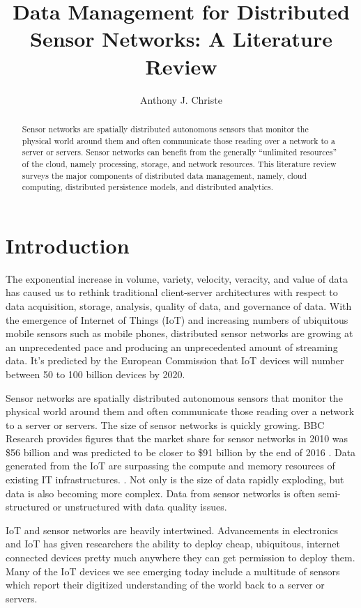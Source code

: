 \documentclass[]{article}
\title{Data Management for Distributed Sensor Networks: A Literature Review}
\author{Anthony J. Christe}
\begin{document}
\maketitle


\begin{abstract}
    Sensor networks are spatially distributed autonomous sensors that monitor the physical world around them and often communicate those reading over a network to a server or servers. Sensor networks can benefit from the generally ``unlimited resources'' of the cloud, namely processing, storage, and network resources. This literature review surveys the major components of distributed data management, namely, cloud computing, distributed persistence models, and distributed analytics.
\end{abstract}

\tableofcontents
\listoffigures
\listoftables
\pagebreak

\section{Introduction} \label{sec:introduction}
The exponential increase in volume, variety, velocity, veracity, and value of data has caused us to rethink traditional client-server architectures with respect to data acquisition, storage, analysis, quality of data, and governance of data. With the emergence of Internet of Things (IoT) and increasing numbers of ubiquitous mobile sensors such as mobile phones, distributed sensor networks are growing at an unprecedented pace and producing an unprecedented amount of streaming data. It's predicted by the European Commission that IoT devices will number between 50 to 100 billion devices by 2020\cite{6072197}.

Sensor networks are spatially distributed autonomous sensors that monitor the physical world around them and often communicate those reading over a network to a server or servers. The size of sensor networks is quickly growing. BBC Research provides figures that the market share for sensor networks in 2010 was \$56 billion and was predicted to be closer to \$91 billion by the end of 2016 \cite{zaslavsky_sensing_2013}. Data generated from the IoT are surpassing the compute and memory resources of existing IT infrastructures. \cite{chen_big_2014}. Not only is the size of data rapidly exploding, but data is also becoming more complex. Data from sensor networks is often semi-structured or unstructured with data quality issues. 

IoT and sensor networks are heavily intertwined. Advancements in electronics and IoT has given researchers the ability to deploy cheap, ubiquitous, internet connected devices pretty much anywhere they can get permission to deploy them. Many of the IoT devices we see emerging today include a multitude of sensors which report their digitized understanding of the world back to a server or servers.
\end{document}
